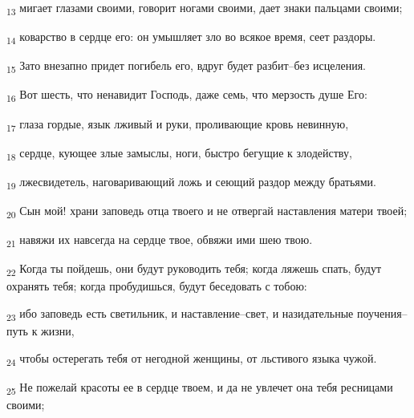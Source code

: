 \begin{tcolorbox}
\textsubscript{13} мигает глазами своими, говорит ногами своими, дает знаки пальцами своими;
\end{tcolorbox}
\begin{tcolorbox}
\textsubscript{14} коварство в сердце его: он умышляет зло во всякое время, сеет раздоры.
\end{tcolorbox}
\begin{tcolorbox}
\textsubscript{15} Зато внезапно придет погибель его, вдруг будет разбит--без исцеления.
\end{tcolorbox}
\begin{tcolorbox}
\textsubscript{16} Вот шесть, что ненавидит Господь, даже семь, что мерзость душе Его:
\end{tcolorbox}
\begin{tcolorbox}
\textsubscript{17} глаза гордые, язык лживый и руки, проливающие кровь невинную,
\end{tcolorbox}
\begin{tcolorbox}
\textsubscript{18} сердце, кующее злые замыслы, ноги, быстро бегущие к злодейству,
\end{tcolorbox}
\begin{tcolorbox}
\textsubscript{19} лжесвидетель, наговаривающий ложь и сеющий раздор между братьями.
\end{tcolorbox}
\begin{tcolorbox}
\textsubscript{20} Сын мой! храни заповедь отца твоего и не отвергай наставления матери твоей;
\end{tcolorbox}
\begin{tcolorbox}
\textsubscript{21} навяжи их навсегда на сердце твое, обвяжи ими шею твою.
\end{tcolorbox}
\begin{tcolorbox}
\textsubscript{22} Когда ты пойдешь, они будут руководить тебя; когда ляжешь спать, будут охранять тебя; когда пробудишься, будут беседовать с тобою:
\end{tcolorbox}
\begin{tcolorbox}
\textsubscript{23} ибо заповедь есть светильник, и наставление--свет, и назидательные поучения--путь к жизни,
\end{tcolorbox}
\begin{tcolorbox}
\textsubscript{24} чтобы остерегать тебя от негодной женщины, от льстивого языка чужой.
\end{tcolorbox}
\begin{tcolorbox}
\textsubscript{25} Не пожелай красоты ее в сердце твоем, и да не увлечет она тебя ресницами своими;
\end{tcolorbox}
